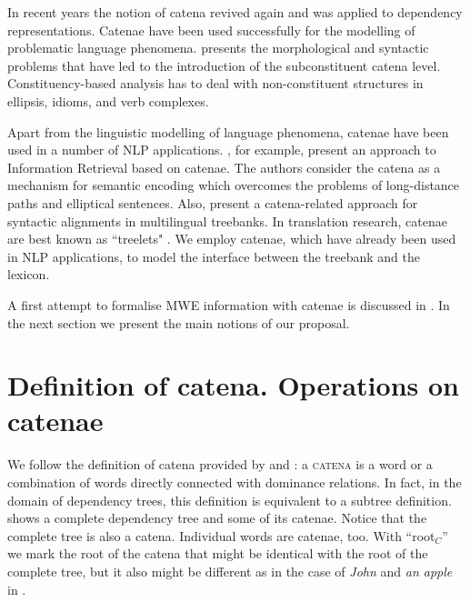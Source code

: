 \documentclass[output=paper]{langsci/langscibook}
\begin{document}
In recent years the notion of catena revived again and was applied to
dependency representations. Catenae have been used successfully for the
modelling of problematic language phenomena. \citet{Gross:2010:PACLIC2010}
presents the morphological and syntactic problems that have led to the
introduction of the subconstituent catena level. Constituency-based analysis
has to deal with non-constituent structures in ellipsis, idioms, and verb
complexes.


Apart from the linguistic modelling of language phenomena, catenae have been
used in a number of NLP applications.
\citet{maxwell-oberlander-croft:2013:ACL2013}, for example, present an
approach to Information Retrieval based on catenae. The authors consider the
catena as a mechanism for semantic encoding which overcomes the problems of
long-distance paths and elliptical sentences. Also,
\citet{SANGUINETTI14.674} present a catena-related approach for syntactic
alignments in multilingual treebanks. In translation research, catenae are
best known as ``treelets" \citep{journals/mt/QuirkM06}. We employ catenae,
which have already been used in NLP applications, to model the interface between the
treebank and the lexicon.

A first attempt to formalise MWE information with catenae is discussed in
\citet{simov-osenova:2015:Depling}. In the next section we present the main
notions of our proposal.


\section{Definition of catena. Operations on catenae}
\label{Catenae}


We follow the definition of catena provided by \cite{OGrady:98} and
\citet{Gross:2010:PACLIC2010}: a \textsc{catena} is a word or a combination of
words directly connected with dominance relations. In fact, in the domain of
dependency trees, this definition is equivalent to a subtree definition.
 shows a complete dependency tree and some of
its catenae. Notice that the complete tree is also a catena. Individual
words are catenae, too. With ``root$_C$'' we mark the root of the catena
that might be identical with the root of the complete tree, but it also
might be different as in the case of \textit{John} and \textit{an apple} in
.
\end{document}
